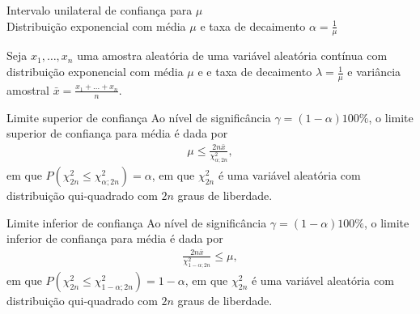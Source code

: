 \documentclass[8pt]{beamer}
\begin{document}
\begin{frame}{Intervalo unilateral de confiança para $\mu$\\ Distribuição exponencial com média $\mu$ e taxa de decaimento $\alpha=\frac{1}{\mu}$}

\small

Seja $x_1, \dots, x_n$ uma amostra aleatória de uma variável aleatória contínua com distribuição exponencial com média $\mu$ e e taxa de decaimento $\lambda=\frac{1}{\mu}$ e variância amostral $\bar{x} = \frac{x_1 + \dots + x_n}{n}$. 

\begin{block}{Limite superior de confiança}
	Ao nível de significância $\gamma=(1-\alpha)100\%$, o limite superior de confiança para média é dada por
	\begin{align*}
	\mu \leq \frac{2n \bar{x}}{\chi^2_{\alpha; 2n}},
	\end{align*}
	em que $P\left( \chi^2_{2n} \leq \chi^2_{\alpha; 2n} \right) = \alpha$, em que $\chi^2_{2n}$ é uma variável aleatória com distribuição qui-quadrado com $2n$ graus de liberdade.
	
\end{block}

\begin{block}{Limite inferior de confiança}
	Ao nível de significância $\gamma=(1-\alpha)100\%$, o limite inferior de confiança para média é dada por
	\begin{align*}
	\frac{2 n \bar{x}}{\chi^{2}_{1-\alpha;2n}} \leq \mu,
	\end{align*}
	em que $P\left( \chi^2_{2n} \leq \chi^{2}_{1-\alpha;2n} \right) = 1-\alpha$, em que $\chi^2_{2n}$ é uma variável aleatória com distribuição qui-quadrado com $2n$ graus de liberdade.
\end{block}

\normalsize

\end{frame}
\end{document}
